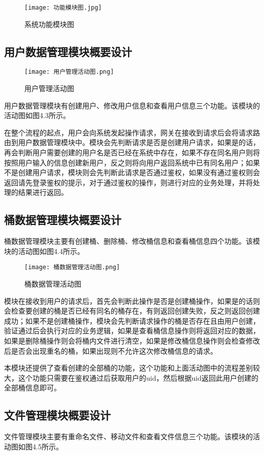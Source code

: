 \begin{figure}[h]
  \centering
  \texttt{[image: 功能模块图.jpg]}
  \caption{系统功能模块图}
\end{figure}

\subsection{用户数据管理模块概要设计}
\begin{figure}[h]
  \centering
  \texttt{[image: 用户管理活动图.png]}
  \caption{用户管理活动图}
\end{figure}

用户数据管理模块有创建用户、修改用户信息和查看用户信息三个功能。该模块的活动图如图4.3所示。

在整个流程的起点，用户会向系统发起操作请求，网关在接收到请求后会将请求路由到用户数据管理模块中。模块会先判断请求是否是创建用户请求，如果是的话，再会判断用户需要创建的用户名是否已经在系统中存在，如果不存在同名用户则将按照用户输入的信息创建新用户，反之则将向用户返回系统中已有同名用户；如果不是创建用户请求，模块则会先判断此请求是否通过鉴权，如果没有通过鉴权则会返回请先登录鉴权的提示，对于通过鉴权的操作，则进行对应的业务处理，并将处理的结果进行返回。

\subsection{桶数据管理模块概要设计}
桶数据管理模块主要有创建桶、删除桶、修改桶信息和查看桶信息四个功能。该模块的活动图如图4.4所示。

\begin{figure}[h]
  \centering
  \texttt{[image: 桶数据管理活动图.png]}
  \caption{桶数据管理活动图}
\end{figure}

模块在接收到用户的请求后，首先会判断此操作是否是创建桶操作，如果是的话则会检查要创建的桶是否已经有同名的桶存在，有则返回创建失败，反之则返回创建成功；如果不是创建桶操作，模块会先判断请求操作的桶是否存在且由用户创建，验证通过后会执行对应的业务逻辑，如果是查看桶信息操作则将返回对应的数据，如果是删除桶操作则会将桶内文件进行清空，如果是修改桶信息操作则会检查修改后是否会出现重名的桶，如果出现则不允许这次修改桶信息的请求。

本模块还提供了查看创建的全部桶的功能，这个功能和上面活动图中的流程差别较大，这个功能只需要在鉴权通过后获取用户的uid，然后根据uid返回此用户创建的全部桶信息即可。
\subsection{文件管理模块概要设计}
文件管理模块主要有重命名文件、移动文件和查看文件信息三个功能。该模块的活动图如图4.5所示。

